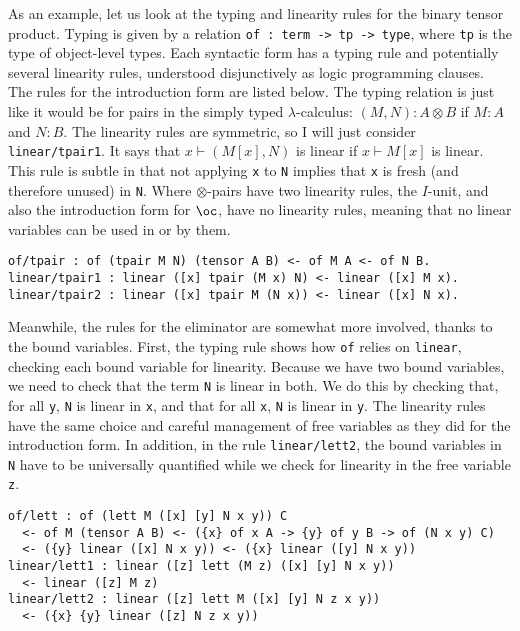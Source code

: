 As an example, let us look at the typing and linearity rules for the binary
tensor product.
Typing is given by a relation \texttt{of : term -> tp -> type}, where
\texttt{tp} is the type of object-level types.
Each syntactic form has a typing rule and potentially several linearity rules,
understood disjunctively as logic programming clauses.
The rules for the introduction form are listed below.
The typing relation is just like it would be for pairs in the simply typed
$\lambda$-calculus: $(M, N) : A \otimes B$ if $M : A$ and $N : B$.
The linearity rules are symmetric, so I will just consider
\texttt{linear/tpair1}.
It says that $x \vdash (M[x], N)$ is linear if $x \vdash M[x]$ is linear.
This rule is subtle in that not applying \texttt{x} to \texttt{N} implies that
\texttt{x} is fresh (and therefore unused) in \texttt{N}.
Where $\otimes$-pairs have two linearity rules, the $I$-unit, and also the
introduction form for $\oc$, have no linearity rules, meaning that no linear
variables can be used in or by them.

\begin{verbatim}
of/tpair : of (tpair M N) (tensor A B) <- of M A <- of N B.
linear/tpair1 : linear ([x] tpair (M x) N) <- linear ([x] M x).
linear/tpair2 : linear ([x] tpair M (N x)) <- linear ([x] N x).
\end{verbatim}

Meanwhile, the rules for the eliminator are somewhat more involved, thanks to
the bound variables.
First, the typing rule shows how \texttt{of} relies on \texttt{linear}, checking
each bound variable for linearity.
Because we have two bound variables, we need to check that the term \texttt{N}
is linear in both.
We do this by checking that, for all \texttt{y}, \texttt{N} is linear in
\texttt{x}, and that for all \texttt{x}, \texttt{N} is linear in \texttt{y}.
The linearity rules have the same choice and careful management of free
variables as they did for the introduction form.
In addition, in the rule \texttt{linear/lett2}, the bound variables in
\texttt{N} have to be universally quantified while we check for linearity in the
free variable \texttt{z}.

\begin{verbatim}
of/lett : of (lett M ([x] [y] N x y)) C
  <- of M (tensor A B) <- ({x} of x A -> {y} of y B -> of (N x y) C)
  <- ({y} linear ([x] N x y)) <- ({x} linear ([y] N x y))
linear/lett1 : linear ([z] lett (M z) ([x] [y] N x y))
  <- linear ([z] M z)
linear/lett2 : linear ([z] lett M ([x] [y] N z x y))
  <- ({x} {y} linear ([z] N z x y))
\end{verbatim}

